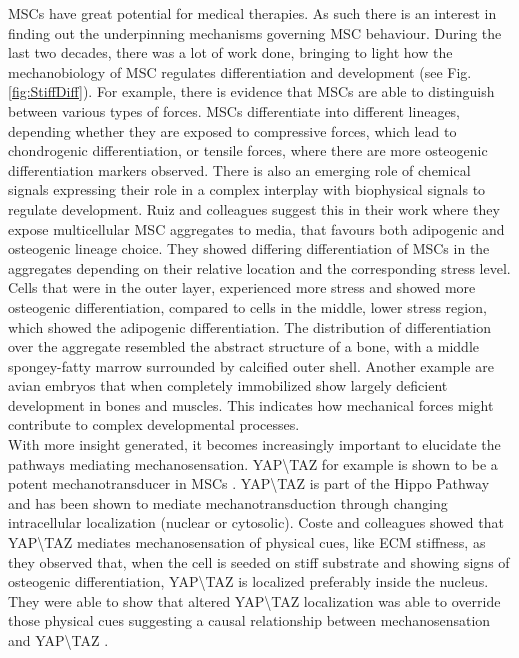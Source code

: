 MSCs have great potential for medical therapies. As such there is an interest in finding out the underpinning mechanisms governing MSC behaviour. During the last two decades, there was a lot of work done, bringing to light how the mechanobiology of MSC regulates differentiation and development (see Fig. \ref{fig:StiffDiff}). For example, there is evidence that MSCs are able to distinguish between various types of forces. MSCs differentiate into different lineages, depending whether they are exposed to compressive forces, which lead to chondrogenic differentiation, or tensile forces, where there are more osteogenic differentiation markers observed.\cite{Kearney2010, Saitoh2000} There is also an emerging role of chemical signals expressing their role in a complex interplay with biophysical signals to regulate development. Ruiz and colleagues suggest this in their work where they expose multicellular MSC aggregates to media, that favours both adipogenic and osteogenic lineage choice. They showed differing differentiation of MSCs in the aggregates depending on their relative location and the corresponding stress level. Cells that were in the outer layer, experienced more stress and showed more osteogenic differentiation, compared to cells in the middle, lower stress region, which showed the adipogenic differentiation. \cite{Ruiz2008} The distribution of differentiation over the aggregate resembled the abstract structure of a bone, with a middle spongey-fatty marrow surrounded by calcified outer shell. Another example are avian embryos that when completely immobilized show largely deficient development in bones and muscles.\cite{Castillo2010} This indicates how mechanical forces might contribute to complex developmental processes.\\ 

With more insight generated, it becomes increasingly important to elucidate the pathways mediating mechanosensation. YAP\textbackslash{}TAZ for example is shown to be a potent mechanotransducer in MSCs \cite{Halder2012}. YAP\textbackslash{}TAZ is part of the Hippo Pathway and has been shown to mediate mechanotransduction through changing intracellular localization (nuclear or cytosolic). Coste and colleagues showed that YAP\textbackslash{}TAZ mediates mechanosensation of physical cues, like ECM stiffness, as they observed that, when the cell is seeded on stiff substrate and showing signs of osteogenic differentiation, YAP\textbackslash{}TAZ is localized preferably inside the nucleus. They were able to show that altered YAP\textbackslash{}TAZ localization was able to override those physical cues suggesting a causal relationship between mechanosensation and YAP\textbackslash{}TAZ \cite{Coste2010}.



